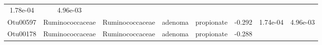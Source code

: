 \documentclass[11pt,]{article}
\begin{document}
\begin{longtable}[]{@{}cccccccc@{}}
\begin{minipage}[t]{0.08\columnwidth}
1.78e-04\strut
\end{minipage} & \begin{minipage}[t]{0.08\columnwidth}\centering\strut
4.96e-03\strut
\end{minipage}\tabularnewline
\begin{minipage}[t]{0.08\columnwidth}\centering\strut
Otu00597\strut
\end{minipage} & \begin{minipage}[t]{0.15\columnwidth}\centering\strut
Ruminococcaceae\strut
\end{minipage} & \begin{minipage}[t]{0.15\columnwidth}\centering\strut
Ruminococcaceae\strut
\end{minipage} & \begin{minipage}[t]{0.08\columnwidth}\centering\strut
adenoma\strut
\end{minipage} & \begin{minipage}[t]{0.09\columnwidth}\centering\strut
propionate\strut
\end{minipage} & \begin{minipage}[t]{0.07\columnwidth}\centering\strut
-0.292\strut
\end{minipage} & \begin{minipage}[t]{0.08\columnwidth}\centering\strut
1.74e-04\strut
\end{minipage} & \begin{minipage}[t]{0.08\columnwidth}\centering\strut
4.96e-03\strut
\end{minipage}\tabularnewline
\begin{minipage}[t]{0.08\columnwidth}\centering\strut
Otu00178\strut
\end{minipage} & \begin{minipage}[t]{0.15\columnwidth}\centering\strut
Ruminococcaceae\strut
\end{minipage} & \begin{minipage}[t]{0.15\columnwidth}\centering\strut
Ruminococcaceae\strut
\end{minipage} & \begin{minipage}[t]{0.08\columnwidth}\centering\strut
adenoma\strut
\end{minipage} & \begin{minipage}[t]{0.09\columnwidth}\centering\strut
propionate\strut
\end{minipage} & \begin{minipage}[t]{0.07\columnwidth}\centering\strut
-0.288\strut
\end{minipage} & \begin{minipage}[t]{0.08\columnwidth}\centering\strut

\end{minipage}
\end{longtable}
\end{document}
